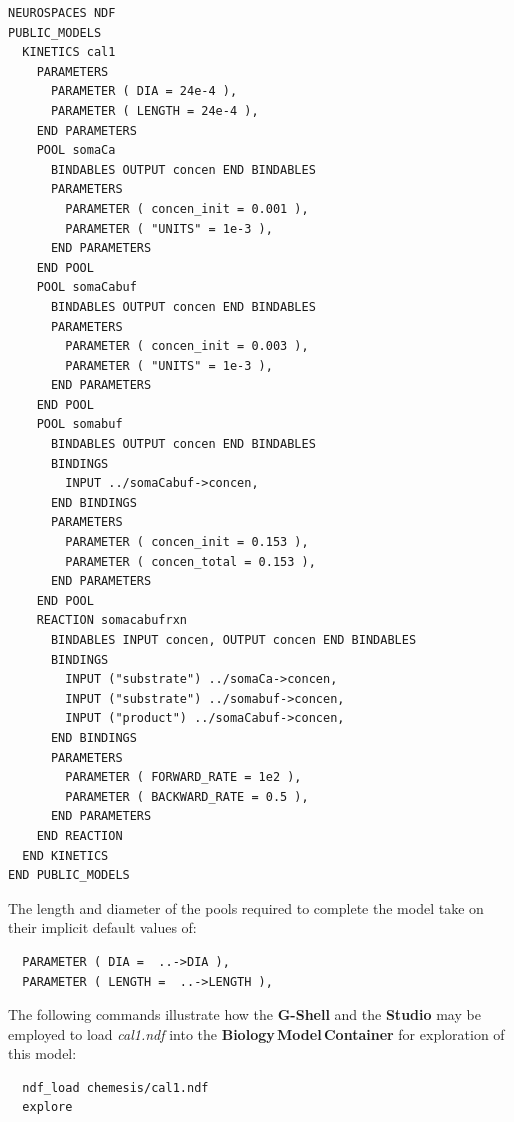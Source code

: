 \documentclass[11pt,3p,twocolumn]{JMN}
\begin{document}
\begin{tiny}
\begin{verbatim}
NEUROSPACES NDF
PUBLIC_MODELS
  KINETICS cal1
    PARAMETERS
      PARAMETER ( DIA = 24e-4 ),
      PARAMETER ( LENGTH = 24e-4 ),
    END PARAMETERS
    POOL somaCa
      BINDABLES OUTPUT concen END BINDABLES
      PARAMETERS
        PARAMETER ( concen_init = 0.001 ),
        PARAMETER ( "UNITS" = 1e-3 ),
      END PARAMETERS
    END POOL
    POOL somaCabuf
      BINDABLES OUTPUT concen END BINDABLES
      PARAMETERS
        PARAMETER ( concen_init = 0.003 ),
        PARAMETER ( "UNITS" = 1e-3 ),
      END PARAMETERS
    END POOL
    POOL somabuf
      BINDABLES OUTPUT concen END BINDABLES
      BINDINGS
        INPUT ../somaCabuf->concen,
      END BINDINGS
      PARAMETERS
        PARAMETER ( concen_init = 0.153 ),
        PARAMETER ( concen_total = 0.153 ),
      END PARAMETERS
    END POOL
    REACTION somacabufrxn
      BINDABLES INPUT concen, OUTPUT concen END BINDABLES
      BINDINGS
        INPUT ("substrate") ../somaCa->concen,
        INPUT ("substrate") ../somabuf->concen,
        INPUT ("product") ../somaCabuf->concen,
      END BINDINGS
      PARAMETERS
        PARAMETER ( FORWARD_RATE = 1e2 ),
        PARAMETER ( BACKWARD_RATE = 0.5 ),
      END PARAMETERS
    END REACTION
  END KINETICS
END PUBLIC_MODELS
\end{verbatim}
\end{tiny}

The length and diameter of the pools required to complete the model take on their implicit default values of:

\begin{tiny}
\begin{verbatim}
  PARAMETER ( DIA =  ..->DIA ),
  PARAMETER ( LENGTH =  ..->LENGTH ),
\end{verbatim}
\end{tiny}

The following commands illustrate how the {\bf G-Shell} and the {\bf Studio} may be employed to load  {\it cal1.ndf} into the {\bf Biology\,Model\,Container} for exploration of this model:

\begin{tiny}
\begin{verbatim}
  ndf_load chemesis/cal1.ndf
  explore
\end{verbatim}
\end{tiny}

%
\end{document}
